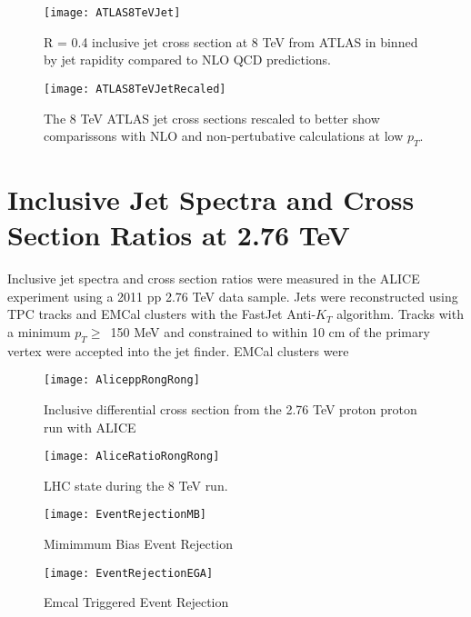 \begin{figure}[h]
\texttt{[image: ATLAS8TeVJet]}
\centering
\caption{R = 0.4 inclusive jet cross section at 8 TeV from ATLAS in binned by jet rapidity compared to NLO QCD predictions\cite{Aaboud:2017dvo}.}
\label{fig:ATLAS8TeV}
\end{figure}

\begin{figure}[h]
\texttt{[image: ATLAS8TeVJetRecaled]}
\centering
\caption{The 8 TeV ATLAS jet cross sections rescaled to better show comparissons with NLO and non-pertubative calculations at low $p_{T}$\cite{Aaboud:2017dvo}.}
\label{fig:ATLAS8TeVRescale}
\end{figure}

\section{Inclusive Jet Spectra and Cross Section Ratios at 2.76 TeV}
Inclusive jet spectra and cross section ratios were measured in the ALICE experiment using a 2011 pp 2.76 TeV data sample\cite{MA2013319}.  Jets were reconstructed using TPC tracks and EMCal clusters with the FastJet Anti-$K_{T}$ algorithm.  Tracks with a minimum $p_{T} \geq \,$ 150 MeV and constrained to within 10 cm of the primary vertex were accepted into the jet finder.  EMCal clusters were 

\begin{figure}[h]
\texttt{[image: AliceppRongRong]}
\centering
\caption{Inclusive differential cross section from the 2.76 TeV proton proton run with ALICE}
\label{fig:RunEff}
\end{figure}

\begin{figure}[h]
\texttt{[image: AliceRatioRongRong]}
\centering
\caption{LHC state during the 8 TeV run. }
\label{fig:RunEff}
\end{figure}

\begin{figure}[!tbp]
  \centering
  \begin{minipage}[b]{0.4\textwidth}
    \texttt{[image: EventRejectionMB]}
    \caption{Mimimmum Bias Event Rejection}
  \end{minipage}
  \hfill
  \begin{minipage}[b]{0.49\textwidth}
    \texttt{[image: EventRejectionEGA]}
    \caption{Emcal Triggered Event Rejection}
  \end{minipage}
\end{figure}